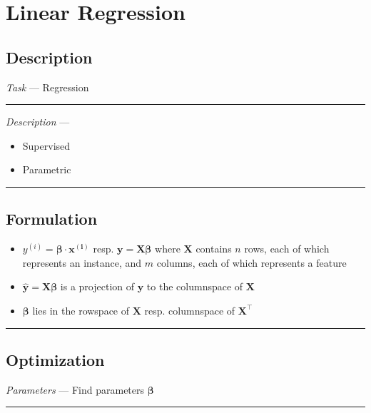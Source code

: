 \section{Linear Regression}
\subsection*{Description}
\emph{Task} --- Regression

{\color{lightgray}\hrule height 0.001mm}

\emph{Description} --- 
\begin{itemize}
    \item Supervised 
    \item Parametric
\end{itemize}

{\color{black}\hrule height 0.001mm}

\subsection*{Formulation}

\begin{itemize}
    \item $y^{(i)} = \boldsymbol{\beta} \cdot \boldsymbol{x^{(i)}}$ resp. $\boldsymbol{y} = \boldsymbol{X}\boldsymbol{\beta}$ where $\boldsymbol{X}$ contains $n$ rows, each of which represents an instance, and $m$ columns, each of which represents a feature
    \item $\hat{\boldsymbol{y}} = \boldsymbol{X}\boldsymbol{\beta}$ is a projection of $\boldsymbol{y}$ to the columnspace of $\boldsymbol{X}$
    \item $\boldsymbol{\beta}$ lies in the rowspace of $\boldsymbol{X}$ resp. columnspace of $\boldsymbol{X}^\intercal$
\end{itemize}

{\color{black}\hrule height 0.001mm}

\subsection*{Optimization}
\emph{Parameters} --- Find parameters $\boldsymbol{\beta}$

{\color{lightgray}\hrule height 0.001mm}

